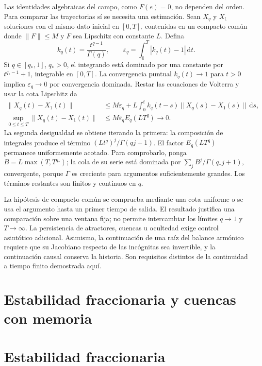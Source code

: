Las identidades algebraicas del campo, como $F(e)=0$, no dependen del
orden. Para comparar las trayectorias sí se necesita una estimación.
Sean $X_q$ y $X_1$ soluciones con el mismo dato inicial en $[0,T]$,
contenidas en un compacto común donde $\|F\|\le M$ y $F$ sea Lipschitz
con constante $L$. Defina
\[
 k_q(t)=\frac{t^{q-1}}{\Gamma(q)},\qquad
 \varepsilon_q=\int_0^T|k_q(t)-1|\,\mathrm dt.
\]
Si $q\in[q_*,1]$, $q_*>0$, el integrando está dominado por una constante
por $t^{q_*-1}+1$, integrable en $[0,T]$. La convergencia puntual
$k_q(t)\to1$ para $t>0$ implica $\varepsilon_q\to0$ por convergencia
dominada. Restar las ecuaciones de Volterra y usar la cota Lipschitz da
\begin{align*}
 \|X_q(t)-X_1(t)\|
 &\le M\varepsilon_q+
 L\int_0^t k_q(t-s)\|X_q(s)-X_1(s)\|\,\mathrm ds,\\
 \sup_{0\le t\le T}\|X_q(t)-X_1(t)\|
 &\le M\varepsilon_q E_q(LT^q)\longrightarrow0.
\end{align*}
La segunda desigualdad se obtiene iterando la primera: la composición
de integrales produce el término $(Lt^q)^j/\Gamma(qj+1)$.
El factor $E_q(LT^q)$ permanece uniformemente acotado. Para comprobarlo,
ponga $B=L\max(T,T^{q_*})$; la cola de su serie está dominada por
$\sum_j B^j/\Gamma(q_*j+1)$, convergente, porque $\Gamma$ es creciente
para argumentos suficientemente grandes. Los términos restantes son
finitos y continuos en $q$.

La hipótesis de compacto común se comprueba mediante una cota uniforme o
se usa el argumento hasta un primer tiempo de salida. El resultado
justifica una comparación sobre una ventana fija; no permite intercambiar
los límites $q\to1$ y $T\to\infty$. La persistencia de atractores,
cuencas u ocultedad exige control asintótico adicional. Asimismo, la
continuación de una raíz del balance armónico requiere que su Jacobiano
respecto de las incógnitas sea invertible, y la continuación causal
conserva la historia. Son requisitos distintos de la continuidad a
tiempo finito demostrada aquí.
\fi

\ifdefined\HAFOFractionalBlockStability
\ifdefined\HAFOFractionalBlockOperators\else
\ifHAFOBasinMaterial
\section{Estabilidad fraccionaria y cuencas con memoria}
\else
\section{Estabilidad fraccionaria}
\fi
\label{sec:fundamentos-estabilidad}
\fi
